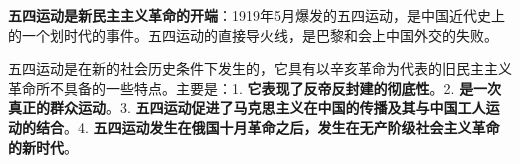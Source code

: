 \textbf{五四运动是{新民主主义革命}的开端}：{1919}年{5}月爆发的五四运动，是中国近代史上的一个划时代的事件。五四运动的直接导火线，是巴黎和会上中国外交的失败。

{五四运动是在新的社会历史条件下发生的，它具有以辛亥革命为代表的旧民主主义革命所不具备的一些特点。主要是：1.
}\textbf{它表现了反帝反封建的彻底性}{。2.
}\textbf{是一次真正的群众运动}{。3.
}\textbf{五四运动促进了马克思主义在中国的传播及其与中国工人运动的结合}{。4.
}\textbf{五四运动发生在俄国十月革命之后，发生在无产阶级社会主义革命的新时代}{。}
